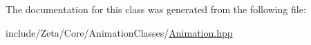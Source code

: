 The documentation for this class was generated from the following file\+:\begin{DoxyCompactItemize}
\item 
include/\+Zeta/\+Core/\+Animation\+Classes/\hyperlink{Animation_8hpp}{Animation.\+hpp}\end{DoxyCompactItemize}
